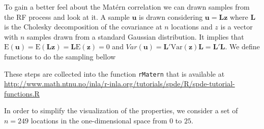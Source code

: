 To gain a better feel about the Mat\'{e}rn 
correlation we can drawn samples from the 
RF process and look at it. 
A sample $\mathbf{u}$ is drawn considering 
$\mathbf{u} = \mathbf{Lz}$
where $\mathbf{L}$ is the Cholesky decomposition 
of the covariance at $n$ locations and 
$z$ is a vector with $n$ samples drawn from a 
standard Gaussian distribution. 
It implies that 
$\textrm{E}(\mathbf{u}) = 
\textrm{E}(\mathbf{Lz}) = \mathbf{L}\textrm{E}(\mathbf{z})=0$ 
and $Var(\mathbf{u}) = \mathbf{L}'\textrm{Var}(\mathbf{z})\mathbf{L}=\mathbf{L}'\mathbf{L}$. 
We define functions to do the sampling bellow 
\begin{knitrout}
\color{fgcolor}\begin{kframe}
\begin{alltt}
 \hlkwb{<-} \hlstd{(}\hlstd{,} \hlstd{,} \hlstd{)} 
     \hlopt{*}  \hlopt{*}
        \hlopt{*}\hlopt{^} \hlopt{/} \hlstd{(} \hlopt{*} \hlopt{^}\hlopt{-}\hlstd{))}
 \hlkwb{<-} \hlstd{(}\hlstd{,} \hlstd{,} \hlstd{=}\hlstd{) \{}
     \hlstd{(} \hlkwb{<-} 
    \hlstd{(} \hlstd{(}\hlopt{*} 
\hlstd{\}}
\end{alltt}
\end{kframe}
\end{knitrout}
These steps are collected into the function 
\texttt{rMatern} that is available at 
\url{http://www.math.ntnu.no/inla/r-inla.org/tutorials/spde/R/spde-tutorial-functions.R}


In order to simplify the visualization of the 
properties, we consider a set of $n=249$ locations 
in the one-dimensional space from 0 to $25$. 
\begin{knitrout}
\color{fgcolor}\begin{kframe}
\begin{alltt}
 \hlkwb{<-} \hlopt{:}\hlopt{/}
 \hlkwb{<-} \hlstd{(}
\end{alltt}
\end{kframe}
\end{knitrout}

